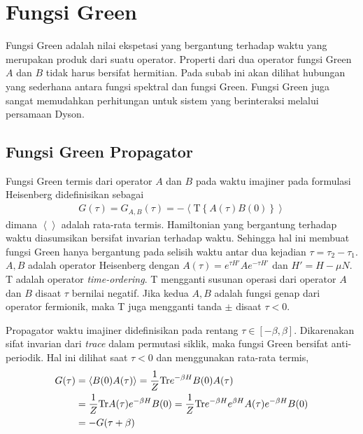 \section{Fungsi Green}

Fungsi Green adalah nilai ekspetasi yang bergantung terhadap waktu yang merupakan produk dari suatu operator. Properti dari dua operator fungsi Green $A$ dan $B$ tidak harus bersifat hermitian. Pada subab ini akan dilihat hubungan yang sederhana antara fungsi spektral dan fungsi Green. Fungsi Green juga sangat memudahkan perhitungan untuk sistem yang berinteraksi melalui persamaan Dyson.

\subsection{Fungsi Green Propagator}
Fungsi Green termis dari operator $A$ dan $B$ pada waktu imajiner pada formulasi Heisenberg didefinisikan sebagai
\begin{align}
G(\tau) =  G_{A,B}(\tau) = - \left\langle \text{T}\left\lbrace A(\tau) B(0) \right\rbrace \right\rangle
\end{align}
dimana $\left\langle \right\rangle$ adalah rata-rata termis. Hamiltonian yang bergantung terhadap waktu diasumsikan bersifat invarian terhadap waktu. Sehingga hal ini membuat fungsi Green hanya bergantung pada selisih waktu antar dua kejadian $\tau = \tau_2 - \tau_1$. $A,B$ adalah operator Heisenberg dengan $A(\tau) = e^{\tau H'} A e^{-\tau H'}$ dan $H' = H - \mu N$. T adalah operator \textit{time-ordering}. T mengganti susunan operasi dari operator $A$ dan $B$ disaat $\tau$ bernilai negatif. Jika kedua $A,B$ adalah fungsi genap dari operator fermionik, maka T juga mengganti tanda $\pm$ disaat $\tau < 0$.

Propagator waktu imajiner didefinisikan pada rentang $\tau \in [-\beta,\beta]$. Dikarenakan sifat invarian dari \textit{trace} dalam permutasi siklik, maka fungsi Green bersifat anti-periodik. Hal ini dilihat saat $\tau < 0$ dan menggunakan rata-rata termis,
\begin{align}
G(\tau) &= \left\langle B(0) A(\tau) \right\rangle = \frac{1}{Z} \text{Tr} e^{-\beta H} B(0) A(\tau) \notag \\
&= \frac{1}{Z}\text{Tr} A(\tau) e^{-\beta H} B(0) = \frac{1}{Z} \text{Tr} e^{-\beta H} e^{\beta H} A(\tau) e^{-\beta H} B(0)\notag\\
&= - G(\tau + \beta)
\end{align}


